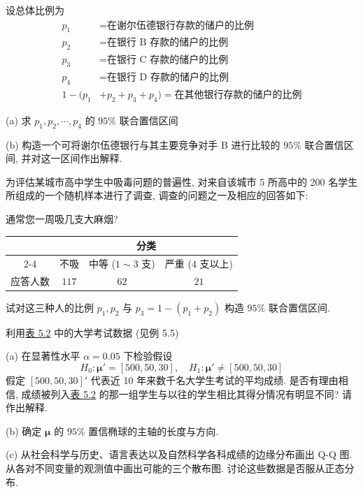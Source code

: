 设总体比例为
\begin{align*}
p_{1}&=\text{在谢尔伍德银行存款的储户的比例}\\
p_{2}&=\text{在银行 B 存款的储户的比例}\\
p_{3}&=\text{在银行 C 存款的储户的比例}\\
p_{4}&=\text{在银行 D 存款的储户的比例}\\
1-(p_{1}&+p_{2}+p_{3}+p_{4})=\text{在其他银行存款的储户的比例}
\end{align*}

(a) 求 $p_{1},p_{2},\cdots,p_{4}$ 的 $95\%$ 联合置信区间

(b) 构造一个可将谢尔伍德银行与其主要竞争对手 B 进行比较的 $95\%$ 联合置信区间, 并对这一区间作出解释.

\medskip
\noindent{}\quad 为评估某城市高中学生中吸毒问题的普遍性, 对来自该城市 5 所高中的 200 名学生所组成的一个随机样本进行了调查, 调查的问题之一及相应的回答如下:

通常您一周吸几支大麻烟?

\begin{mvtable}
\centering
\begin{tabular}{|c|c|c|c|}
\hline
\multirow{2}{*}{} & \multicolumn{3}{c|}{分类}\\
\cline{2-4}
 & 不吸 & 中等 ($1\sim3$ 支) & 严重 ($4$ 支以上)\\
\hline
应答人数 & $117$ & $62$ & $21$\\
\hline
\end{tabular}
\end{mvtable}

试对这三种人的比例 $p_{1},p_{2}$ 与 $p_{3}=1-(p_{1}+p_{2})$ 构造 $95\%$ 联合置信区间.

\medskip
\noindent{}

\medskip
\noindent{}\quad 利用\hyperref[tab:5.2]{表 5.2} 中的大学考试数据 (见例 5.5)

\noindent (a) 在显著性水平 $\alpha=0.05$ 下检验假设
\[
H_{0}:\boldsymbol{\mu}'=[500,50,30],\quad H_{1}:\boldsymbol{\mu}'\ne[500,50,30]
\]
假定 $[500,50,30]'$ 代表近 10 年来数千名大学生考试的平均成绩. 是否有理由相信, 成绩被列入\hyperref[tab:5.2]{表 5.2} 的那一组学生与以往的学生相比其得分情况有明显不同? 请作出解释.

\noindent (b) 确定 $\boldsymbol{\mu}$ 的 $95\%$ 置信椭球的主轴的长度与方向.

\noindent (c) 从社会科学与历史、语言表达以及自然科学各科成绩的边缘分布画出 Q-Q 图. 从各对不同变量的观测值中画出可能的三个散布图. 讨论这些数据是否服从正态分布.

